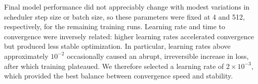 \documentclass[preprint,review,12pt,numafflabel]{elsarticle}
\begin{document}

Final model performance did not appreciably change with modest variations in scheduler step size or batch size, so these parameters were fixed at 4 and 512, respectively, for the remaining training runs. Learning rate and time to convergence were inversely related: higher learning rates accelerated convergence but produced less stable optimization. In particular, learning rates above approximately $10^{-2}$ occasionally caused an abrupt, irreversible increase in loss, after which training plateaued. We therefore selected a learning rate of $2\times10^{-3}$, which provided the best balance between convergence speed and stability.
\end{document}
